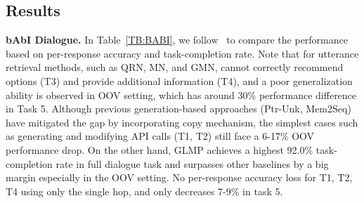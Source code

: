 \documentclass{article} \usepackage{iclr2019_conference,times}
\begin{document}
\subsection{Results}
\textbf{bAbI Dialogue. }
In Table~\ref{TB:BABI}, we follow~\citet{bordes2016learning} to compare the performance based on per-response accuracy and task-completion rate. Note that for utterance retrieval methods, such as QRN, MN, and GMN, cannot correctly recommend options (T3) and provide additional information (T4), and a poor generalization ability is observed in OOV setting, which has around 30\% performance difference in Task 5. Although previous generation-based approaches (Ptr-Unk, Mem2Seq) have mitigated the gap by incorporating copy mechanism, the simplest cases such as generating and modifying API calls (T1, T2) still face a 6-17\% OOV performance drop. On the other hand, GLMP achieves a highest 92.0\% task-completion rate in full dialogue task and surpasses other baselines by a big margin especially in the OOV setting. No per-response accuracy loss for T1, T2, T4 using only the single hop, and only decreases 7-9\% in task 5. 
\end{document}
